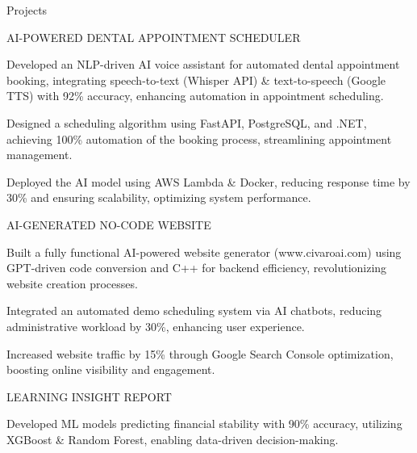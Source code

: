 \documentclass{resume} %
\begin{document}
    \begin{rSection}{Projects}
                    \begin{rSubsection}
                                    {AI{-}POWERED DENTAL APPOINTMENT SCHEDULER}
                                {}{}{}
                                    \item Developed an NLP{-}driven AI voice assistant for automated dental appointment booking, integrating speech{-}to{-}text (Whisper API) \& text{-}to{-}speech (Google TTS) with 92\% accuracy, enhancing automation in appointment scheduling.
                                    \item Designed a scheduling algorithm using FastAPI, PostgreSQL, and .NET, achieving 100\% automation of the booking process, streamlining appointment management.
                                    \item Deployed the AI model using AWS Lambda \& Docker, reducing response time by 30\% and ensuring scalability, optimizing system performance.
                            \end{rSubsection}
                    \begin{rSubsection}
                                    {AI{-}GENERATED NO{-}CODE WEBSITE}
                                {}{}{}
                                    \item Built a fully functional AI{-}powered website generator (www.civaroai.com) using GPT{-}driven code conversion and C++ for backend efficiency, revolutionizing website creation processes.
                                    \item Integrated an automated demo scheduling system via AI chatbots, reducing administrative workload by 30\%, enhancing user experience.
                                    \item Increased website traffic by 15\% through Google Search Console optimization, boosting online visibility and engagement.
                            \end{rSubsection}
                    \begin{rSubsection}
                                    {LEARNING INSIGHT REPORT}
                                {}{}{}
                                    \item Developed ML models predicting financial stability with 90\% accuracy, utilizing XGBoost \& Random Forest, enabling data{-}driven decision{-}making.

\end{rSubsection}
\end{rSection}
\end{document}
